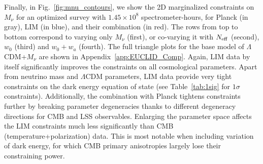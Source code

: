 \documentclass[twocolumn]{aastex631}
\begin{document}
Finally, in Fig.~\ref{fig:mnu_contours}, we show the 2D marginalized constraints on $M_\nu$ for an optimized survey with $1.45\times10^8$ spectrometer-hours, for Planck (in gray), LIM (in blue), and their combination (in red). The rows from top to bottom correspond to varying only $M_\nu$ (first), or co-varying it with $N_{\rm eff}$ (second), $w_0$ (third) and $w_0+w_a$ (fourth). The full triangle plots for the base model of $\Lambda$CDM+$M_\nu$ are shown in Appendix~\ref{app:EUCLID_Comp}. Again, LIM data by itself significantly improves the constraints on all cosmological parameters. Apart from neutrino mass and $\Lambda$CDM parameters, LIM data provide very tight constraints on the dark energy equation of state (see Table~\ref{tab:1sig} for $1\sigma$ constraints). Additionally, the combination with Planck tightens constraints further by breaking parameter degeneracies thanks to different degeneracy directions for CMB and LSS observables. Enlarging the parameter space affects the LIM constraints much less significantly than CMB (temperature+polarization) data. This is most notable when including variation of dark energy, for which CMB primary anisotropies largely lose their constraining power.  \vspace{-.05in} \\
\end{document}
